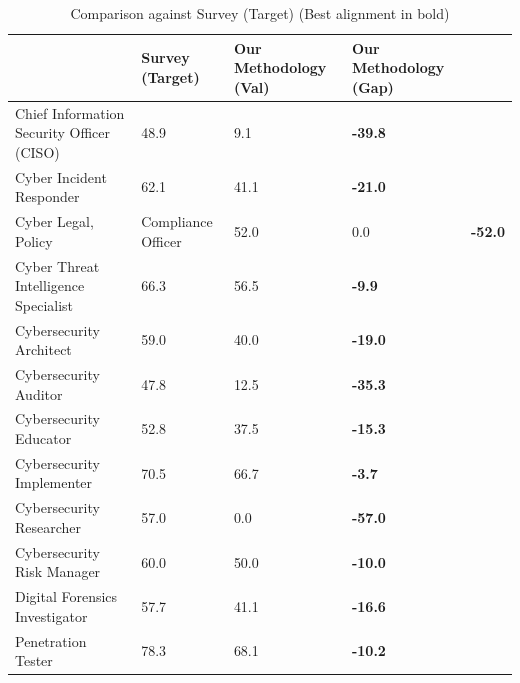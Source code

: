 \begin{table}
\caption{Comparison against Survey (Target) (Best alignment in bold)}
\label{tab:comparative_analysis_best}
\begin{tabular}{llll}
\toprule
 & Survey (Target) & Our Methodology (Val) & Our Methodology (Gap) \\
\midrule
Chief Information Security Officer (CISO) & 48.9 & 9.1 & \textbf{-39.8} \\
Cyber Incident Responder & 62.1 & 41.1 & \textbf{-21.0} \\
Cyber Legal, Policy & Compliance Officer & 52.0 & 0.0 & \textbf{-52.0} \\
Cyber Threat Intelligence Specialist & 66.3 & 56.5 & \textbf{-9.9} \\
Cybersecurity Architect & 59.0 & 40.0 & \textbf{-19.0} \\
Cybersecurity Auditor & 47.8 & 12.5 & \textbf{-35.3} \\
Cybersecurity Educator & 52.8 & 37.5 & \textbf{-15.3} \\
Cybersecurity Implementer & 70.5 & 66.7 & \textbf{-3.7} \\
Cybersecurity Researcher & 57.0 & 0.0 & \textbf{-57.0} \\
Cybersecurity Risk Manager & 60.0 & 50.0 & \textbf{-10.0} \\
Digital Forensics Investigator & 57.7 & 41.1 & \textbf{-16.6} \\
Penetration Tester & 78.3 & 68.1 & \textbf{-10.2} \\
\bottomrule
\end{tabular}
\end{table}
